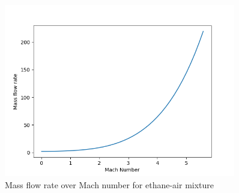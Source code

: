 \documentclass[a4paper,11pt]{article}
\begin{document}
	\begin{figure}[H]
		\centering
		\includegraphics[width=0.9\textwidth]{etan_pow(1mol)/Mass_flow_rate_over_Mach.png}
       		\caption{Mass flow rate over Mach number for ethane-air mixture}
	\end{figure}
\end{document}
